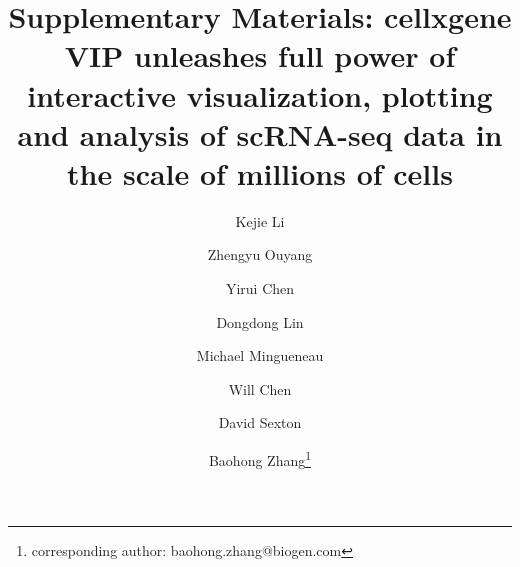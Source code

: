 \author[1]{Kejie Li}
\author[2]{Zhengyu Ouyang}
\author[1]{Yirui Chen}
\author[1]{Dongdong Lin}
\author[1]{Michael Mingueneau}
\author[1]{Will Chen}
\author[1]{David Sexton}
\author[1]{Baohong Zhang\thanks{corresponding author: baohong.zhang@biogen.com}}
                                           
\title{\textbf{Supplementary Materials}: cellxgene VIP unleashes full power of interactive visualization, plotting and analysis of scRNA-seq data in the scale of millions of cells}

\maketitle

